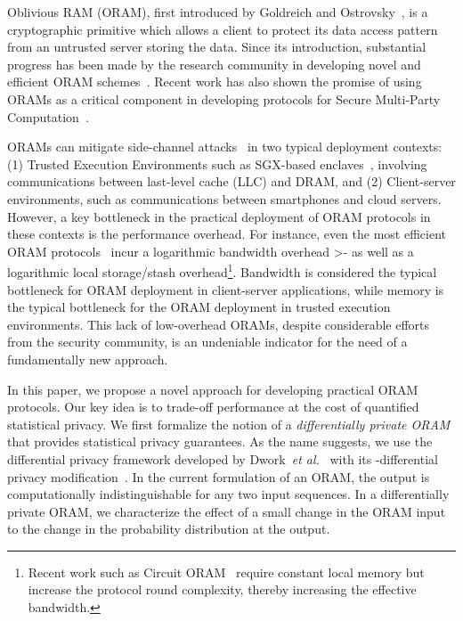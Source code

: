 \documentclass[USenglish,oneside,twocolumn]{article}
\makeatletter
\let\origsection\section
\renewcommand\section{\@ifstar{\starsection}{\nostarsection}}
\newcommand\nostarsection[1]
{\sectionprelude\origsection{#1}\sectionpostlude}
\newcommand\starsection[1]
{\sectionprelude\origsection*{#1}\sectionpostlude}
\newcommand\sectionprelude{\vspace{-1em}
}
\newcommand\sectionpostlude{\vspace{-1em}
}
\makeatother
\begin{document}
\vspace{-3.5em}
\section{Introduction}\label{sec:introduction}

Oblivious RAM (ORAM), first introduced by Goldreich 
and Ostrovsky~\cite{goldreichoram, goldreich1987towards}, 
is a cryptographic primitive which allows a client to 
protect its data access pattern from an untrusted server 
storing the data. Since its introduction, substantial 
progress has been made by the research community in 
developing novel and efficient 
ORAM schemes~\cite{pathoram,ringoram,gentryoramSC,burstoram,oblivistore, SokDatabaseSearch, tree_based_orams, ren2013design}. 
Recent work has also shown the promise of using ORAMs as a 
critical component in developing protocols for 
Secure Multi-Party Computation~\cite{gentryoramSC}.

ORAMs can mitigate side-channel attacks~\cite{accesspatterndisclosure,dautrich2013compromising} in two typical deployment contexts:
(1) Trusted Execution Environments such as SGX-based enclaves~\cite{sgxreference}, involving communications between last-level cache (LLC) and DRAM, and 
(2) Client-server environments, such as communications between smartphones and cloud servers. However, a key bottleneck in 
the practical deployment of ORAM protocols in these contexts is the performance overhead.  
For instance, even the most efficient ORAM protocols~\cite{ringoram,pathoram,burstoram,SSSoram} incur a 
logarithmic bandwidth overhead >- as well as a logarithmic local storage/stash overhead\footnote{Recent work such as Circuit ORAM~\cite{circuitoram} require constant local memory but increase the protocol round complexity, thereby increasing the effective bandwidth.}. 
Bandwidth is considered the typical bottleneck for ORAM deployment in client-server applications, 
while memory is the typical bottleneck for the ORAM deployment in trusted execution environments. 
This lack of low-overhead ORAMs, despite considerable efforts from the security community, 
is an undeniable indicator for the need of a fundamentally new approach.

In this paper, we propose a novel approach for developing practical
ORAM protocols. Our key idea is to trade-off performance at the cost 
of quantified statistical privacy. We first formalize the notion 
of a \emph{differentially private ORAM} that provides statistical privacy 
guarantees. As the name suggests, we use the differential privacy framework 
developed by Dwork~\textit{et al.}~\cite{differentialprivacy} with its -differential 
privacy modification~\cite{epsilondelta}. 
In the current formulation of an ORAM, the output is computationally indistinguishable for any two input sequences.
In a differentially private ORAM, we characterize the effect of a small 
change in the ORAM input to the change in the probability distribution at the output.
\end{document}
